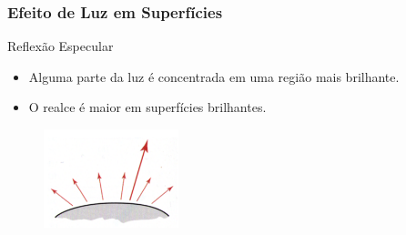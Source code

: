 \documentclass{beamer}
\begin{document}
\begin{frame}
\frametitle{Efeito de Luz em Superfícies}

	\begin{block}{Reflexão Especular}
		\begin{itemize}
			\item Alguma parte da luz é concentrada em uma região mais brilhante.
			\item O realce é maior em superfícies brilhantes.
		\end{itemize}
	\end{block}
	
	\begin{figure}[!h]
			\begin{center}
			\includegraphics[width=0.35\textwidth]{Figures/LuzEsp}
			\end{center}
		\end{figure}	
	
\end{frame}
\end{document}
